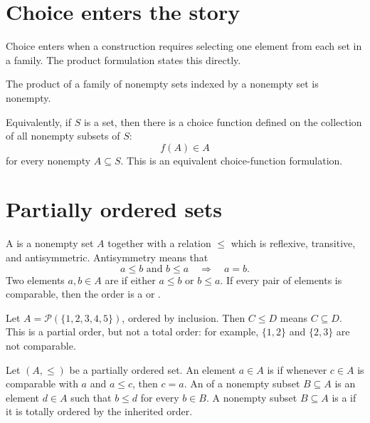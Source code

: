 
\section{Choice enters the story}

Choice enters when a construction requires selecting one element from each set in a family.  The product formulation states this directly.

\begin{axiom}
The product of a family of nonempty sets indexed by a nonempty set is nonempty.
\end{axiom}

\begin{remark}
Equivalently, if \(S\) is a set, then there is a choice function defined on the collection of all nonempty subsets of \(S\):
\[
  f(A)\in A
\]
for every nonempty \(A\subseteq S\).  This is an equivalent choice-function formulation.
\end{remark}

\section{Partially ordered sets}

\begin{definition}
A  is a nonempty set \(A\) together with a relation \(\le\) which is reflexive, transitive, and antisymmetric.  Antisymmetry means that
\[
  a\le b\text{ and }b\le a\quad\Longrightarrow\quad a=b.
\]
Two elements \(a,b\in A\) are  if either \(a\le b\) or \(b\le a\).  If every pair of elements is comparable, then the order is a  or .
\end{definition}

\begin{example}
Let \(A=\mathcal P(\{1,2,3,4,5\})\), ordered by inclusion.  Then \(C\le D\) means \(C\subseteq D\).  This is a partial order, but not a total order: for example, \(\{1,2\}\) and \(\{2,3\}\) are not comparable.
\end{example}

Let \((A,\le)\) be a partially ordered set.  An element \(a\in A\) is  if whenever \(c\in A\) is comparable with \(a\) and \(a\le c\), then \(c=a\).  An  of a nonempty subset \(B\subseteq A\) is an element \(d\in A\) such that \(b\le d\) for every \(b\in B\).  A nonempty subset \(B\subseteq A\) is a  if it is totally ordered by the inherited order.

